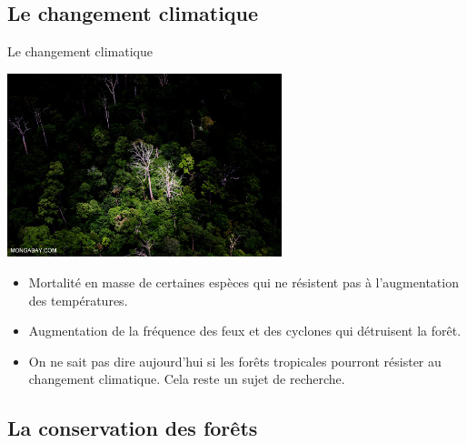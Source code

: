 \documentclass[10pt,table,dvipsnames,compress]{beamer}
\begin{document}
\subsection{Le changement climatique}
\label{sec:orgd1c188b}

\begin{frame}[label={sec:org6712401}]{Le changement climatique}
\begin{center}
\includegraphics[width=0.6\textwidth]{figs/sabah_1899-forest-dieback.jpg}
\end{center}

\begin{itemize}
\item Mortalité en masse de certaines espèces qui ne résistent pas à l'augmentation des températures.
\item Augmentation de la fréquence des feux et des cyclones qui détruisent la forêt.
\item On ne sait pas dire aujourd'hui si les forêts tropicales pourront résister au changement climatique. Cela reste un sujet de recherche.
\end{itemize}
\end{frame}
\subsection{La conservation des forêts}
\label{sec:org583c937}
\end{document}
